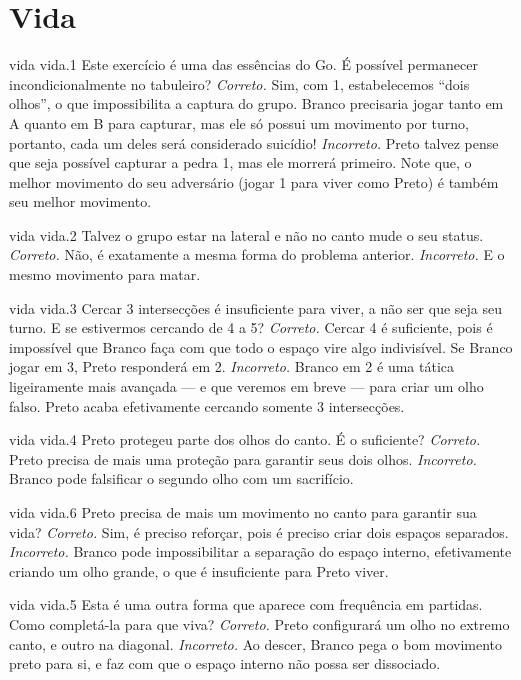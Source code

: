 \chapter{Vida}

\emptypage

\problemAnswerDiagram
  {vida}
  {vida.1}
  {Este exercício é uma das essências do Go. É possível permanecer incondicionalmente no tabuleiro?}
  {\emph{Correto.} Sim, com 1, estabelecemos ``dois olhos'', o que impossibilita a captura do grupo. Branco precisaria jogar tanto em A quanto em B para capturar, mas ele só possui um movimento por turno, portanto, cada um deles será considerado suicídio!}
  {\emph{Incorreto.} Preto talvez pense que seja possível capturar a pedra 1, mas ele morrerá primeiro. Note que, o melhor movimento do seu adversário (jogar 1 para viver como Preto) é também seu melhor movimento.}

\problemAnswerDiagram
  {vida}
  {vida.2}
  {Talvez o grupo estar na lateral e não no canto mude o seu status.}
  {\emph{Correto.} Não, é exatamente a mesma forma do problema anterior.}
  {\emph{Incorreto.} E o mesmo movimento para matar.}

\problemAnswerDiagram
  {vida}
  {vida.3}
  {Cercar 3 intersecções é insuficiente para viver, a não ser que seja seu turno. E se estivermos cercando de 4 a 5?}
  {\emph{Correto.} Cercar 4 é suficiente, pois é impossível que Branco faça com que todo o espaço vire algo indivisível. Se Branco jogar em 3, Preto responderá em 2.}
  {\emph{Incorreto.} Branco em 2 é uma tática ligeiramente mais avançada --- e que veremos em breve --- para criar um olho falso. Preto acaba efetivamente cercando somente 3 intersecções.}

\problemAnswerDiagram
  {vida}
  {vida.4}
  {Preto protegeu parte dos olhos do canto. É o suficiente?}
  {\emph{Correto.} Preto precisa de mais uma proteção para garantir seus dois olhos.}
  {\emph{Incorreto.} Branco pode falsificar o segundo olho com um sacrifício.}

\problemAnswerDiagram
  {vida}
  {vida.6}
  {Preto precisa de mais um movimento no canto para garantir sua vida?}
  {\emph{Correto.} Sim, é preciso reforçar, pois é preciso criar dois espaços separados.}
  {\emph{Incorreto.} Branco pode impossibilitar a separação do espaço interno, efetivamente criando um olho grande, o que é insuficiente para Preto viver.}

\problemAnswerDiagram
  {vida}
  {vida.5}
  {Esta é uma outra forma que aparece com frequência em partidas. Como completá-la para que viva?}
  {\emph{Correto.} Preto configurará um olho no extremo canto, e outro na diagonal.}
  {\emph{Incorreto.} Ao descer, Branco pega o bom movimento preto para si, e faz com que o espaço interno não possa ser dissociado.}